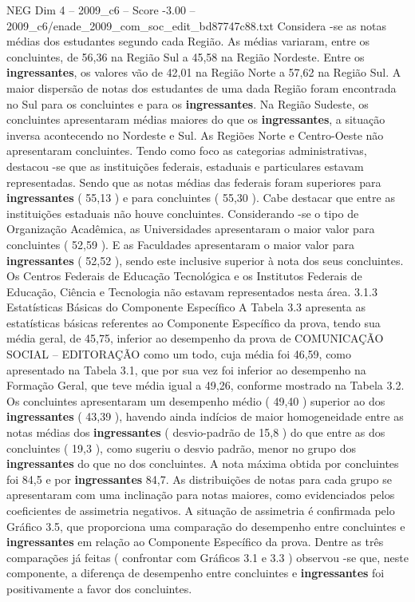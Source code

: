 \begin{textsample}{NEG Dim 4 – 2009\_c6 – Score -3.00 – 2009\_c6/enade\_2009\_com\_soc\_edit\_bd87747c88.txt}
Considera -se as notas médias dos estudantes segundo cada Região.
As médias variaram, entre os concluintes, de 56,36 na Região Sul a 45,58 na Região Nordeste.
Entre os \textbf{ingressantes}, os valores vão de 42,01 na Região Norte a 57,62 na Região Sul.
A maior dispersão de notas dos estudantes de uma dada Região foram encontrada no Sul para os concluintes e para os \textbf{ingressantes}.
Na Região Sudeste, os concluintes apresentaram médias maiores do que os \textbf{ingressantes}, a situação inversa acontecendo no Nordeste e Sul.
As Regiões Norte e Centro-Oeste não apresentaram concluintes.
Tendo como foco as categorias administrativas, destacou -se que as instituições federais, estaduais e particulares estavam representadas.
Sendo que as notas médias das federais foram superiores para \textbf{ingressantes} ( 55,13 ) e para concluintes ( 55,30 ).
Cabe destacar que entre as instituições estaduais não houve concluintes.
Considerando -se o tipo de Organização Acadêmica, as Universidades apresentaram o maior valor para concluintes ( 52,59 ).
E as Faculdades apresentaram o maior valor para \textbf{ingressantes} ( 52,52 ), sendo este inclusive superior à nota dos seus concluintes.
Os Centros Federais de Educação Tecnológica e os Institutos Federais de Educação, Ciência e Tecnologia não estavam representados nesta área. 3.1.3 Estatísticas Básicas do Componente Específico A Tabela 3.3 apresenta as estatísticas básicas referentes ao Componente Específico da prova, tendo sua média geral, de 45,75, inferior ao desempenho da prova de COMUNICAÇÃO SOCIAL – EDITORAÇÃO como um todo, cuja média foi 46,59, como apresentado na Tabela 3.1, que por sua vez foi inferior ao desempenho na Formação Geral, que teve média igual a 49,26, conforme mostrado na Tabela 3.2.
Os concluintes apresentaram um desempenho médio ( 49,40 ) superior ao dos \textbf{ingressantes} ( 43,39 ), havendo ainda indícios de maior homogeneidade entre as notas médias dos \textbf{ingressantes} ( desvio-padrão de 15,8 ) do que entre as dos concluintes ( 19,3 ), como sugeriu o desvio padrão, menor no grupo dos \textbf{ingressantes} do que no dos concluintes.
A nota máxima obtida por concluintes foi 84,5 e por \textbf{ingressantes} 84,7.
As distribuições de notas para cada grupo se apresentaram com uma inclinação para notas maiores, como evidenciados pelos coeficientes de assimetria negativos.
A situação de assimetria é confirmada pelo Gráfico 3.5, que proporciona uma comparação do desempenho entre concluintes e \textbf{ingressantes} em relação ao Componente Específico da prova.
Dentre as três comparações já feitas ( confrontar com Gráficos 3.1 e 3.3 ) observou -se que, neste componente, a diferença de desempenho entre concluintes e \textbf{ingressantes} foi positivamente a favor dos concluintes.

\end{textsample}

